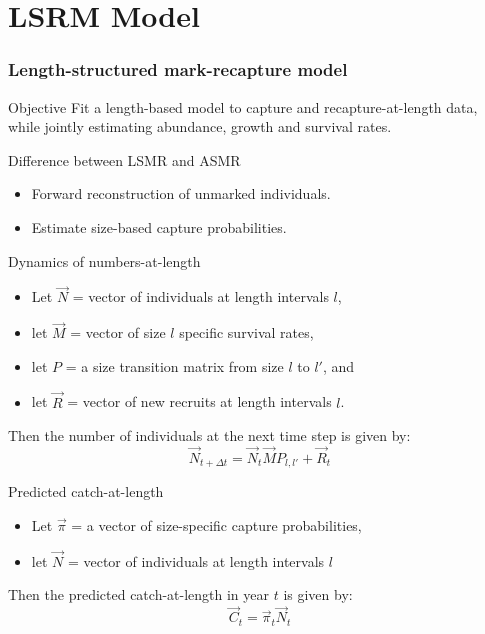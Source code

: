 \documentclass{beamer}
\begin{document}
\section{LSRM Model} %
\label{sec:lsrm_model}
\begin{frame}
	\frametitle{Length-structured mark-recapture model}
	{
		\begin{block}{Objective}
			Fit a length-based model to capture and recapture-at-length data, while jointly estimating abundance, growth and survival rates.
		\end{block}
		
		\begin{block}{Difference between LSMR and ASMR}
			\begin{itemize}
				\item Forward reconstruction of unmarked individuals.
				\item Estimate size-based capture probabilities.
			\end{itemize}
		\end{block}
	}
	{
		\begin{block} {Dynamics of numbers-at-length}
			\begin{itemize}
				\item Let $\vec{N}$ = vector of individuals at length intervals $l$,
				\item let $\vec{M}$ = vector of size $l$ specific survival rates,
				\item let $P$ = a size transition matrix from size $l$ to $l'$, and
				\item let $\vec{R}$ = vector of new recruits at length intervals $l$.
			\end{itemize}
			Then the number of individuals at the next time step is given by:
			\[ \vec{N}_{t+\Delta t} = \vec{N}_t \vec{M} P_{l,l'} + \vec{R}_t\]
			
		\end{block}
	}
	{
		\begin{block} {Predicted catch-at-length}
			\begin{itemize}
				\item Let $\vec{\pi}$ = a vector of size-specific capture probabilities,
				\item let $\vec{N}$ = vector of individuals at length intervals $l$
			\end{itemize}
			Then the predicted catch-at-length in year $t$ is given by:
			\[
				\vec{C}_t  = \vec{\pi}_t \vec{N}_t
			\]
			
		\end{block}
	}
	
	
\end{frame}
\end{document}
